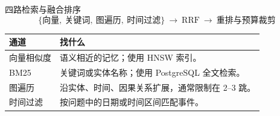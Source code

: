 \begin{frame}{四路检索与融合排序}
    \[
        \{\text{向量},\ \text{关键词},\ \text{图遍历},\ \text{时间过滤}\}
        \ \longrightarrow\ \text{RRF}\ \longrightarrow\ \text{重排与预算裁剪}
    \]
    \vspace{2mm}
    \begin{tabularx}{\linewidth}{@{}p{29mm}Y@{}}
        \toprule
        通道 & 找什么 \\
        \midrule
        向量相似度 & 语义相近的记忆；使用 HNSW 索引。 \\
        BM25 & 关键词或实体名称；使用 PostgreSQL 全文检索。 \\
        图遍历 & 沿实体、时间、因果关系扩展，通常限制在 2--3 跳。 \\
        时间过滤 & 按问题中的日期或时间区间匹配事件。 \\
        \bottomrule
    \end{tabularx}\par
    \vspace{4mm}
\end{frame}

